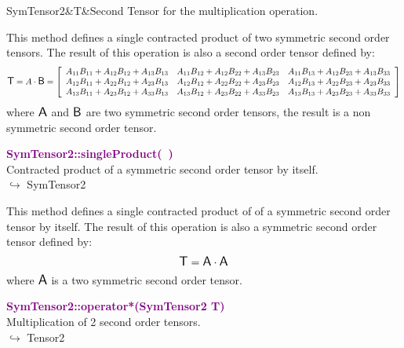 \begin{tcolorbox}[width=\textwidth,myArgs,tabularx={ll|R},title=Arguments of SymTensor2::singleProduct]
SymTensor2&T&Second Tensor for the multiplication operation.
\end{tcolorbox}

This method defines a single contracted product of two symmetric second order tensors.
The result of this operation is also a second order tensor defined by:
\begin{equation*}
\mbox{\large\ensuremath{\mathsf{T}}}=A \cdot \mbox{\large\ensuremath{\mathsf{B}}}=\left[\begin{array}{ccc}
A_{11} B_{11} + A_{12} B_{12} + A_{13} B_{13} & A_{11} B_{12} + A_{12} B_{22} + A_{13} B_{23} & A_{11} B_{13} + A_{12} B_{23} + A_{13} B_{33} \\
A_{12} B_{11} + A_{22} B_{12} + A_{23} B_{13} & A_{12} B_{12} + A_{22} B_{22} + A_{23} B_{23} & A_{12} B_{13} + A_{22} B_{23} + A_{23} B_{33} \\
A_{13} B_{11} + A_{23} B_{12} + A_{33} B_{13} & A_{13} B_{12} + A_{23} B_{22} + A_{33} B_{23} & A_{13} B_{13} + A_{23} B_{23} + A_{33} B_{33}
\end{array}\right]
\end{equation*}
where $\mbox{\large\ensuremath{\mathsf{A}}}$ and $\mbox{\large\ensuremath{\mathsf{B}}}$ are two symmetric second order tensors, the result is a non symmetric second order tensor.

\textcolor{purple}{\textbf{SymTensor2::singleProduct(~)}}\label{SymTensor2::singleProduct()}\\
Contracted product of a symmetric second order tensor by itself.\\ \hspace*{10mm}$\hookrightarrow$ SymTensor2

This method defines a single contracted product of of a symmetric second order tensor by itself.
The result of this operation is also a symmetric second order tensor defined by:
\begin{equation*}
\mbox{\large\ensuremath{\mathsf{T}}} = \mbox{\large\ensuremath{\mathsf{A}}} \cdot \mbox{\large\ensuremath{\mathsf{A}}}
\end{equation*}
where $\mbox{\large\ensuremath{\mathsf{A}}}$ is a two symmetric second order tensor.

\textcolor{purple}{\textbf{SymTensor2::operator*(SymTensor2 T)}}\label{SymTensor2::operator*(SymTensor2 T)}\\
Multiplication of 2 second order tensors.\\ \hspace*{10mm}$\hookrightarrow$ Tensor2

